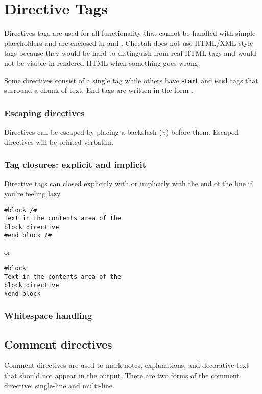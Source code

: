 \section{Directive Tags}



Directives tags are used for all functionality that cannot be handled with
simple placeholders and are enclosed in \code{\#} and \code{/\#}.
Cheetah does not use HTML/XML style tags because they would be hard to
distinguish from real HTML tags and would not be visible in rendered HTML when
something goes wrong.

Some directives consist of a single tag while others have {\bf start} and
{\bf end} tags that surround a chunk of text.  End tags are written in the form
.

\subsubsection{Escaping directives}
Directives can be escaped by placing a backslash ($\backslash$) before them.
Escaped directives will be printed verbatim.

\subsubsection{Tag closures: explicit and implicit}
Directive tags can closed explicitly with \code{/\#} or implicitly with the end
of the line if you're feeling lazy.
\begin{verbatim}
#block /#
Text in the contents area of the
block directive
#end block /#
\end{verbatim}
or
\begin{verbatim}
#block
Text in the contents area of the
block directive
#end block
\end{verbatim}

\subsubsection{Whitespace handling}


\subsection{Comment directives}

Comment directives are used to mark notes, explanations, and decorative text
that should not appear in the output.  There are two forms of the comment
directive: single-line and multi-line.

